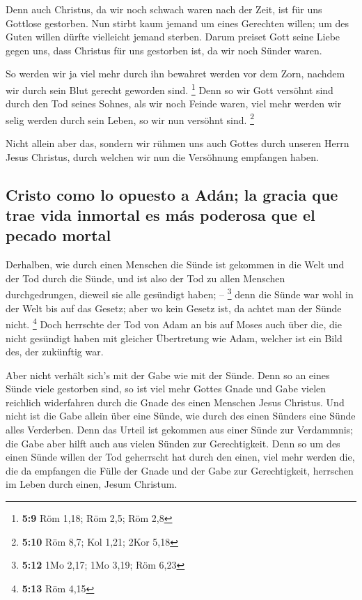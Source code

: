  Denn auch Christus, da wir noch schwach waren nach der
Zeit, ist für uns Gottlose gestorben.  Nun stirbt kaum
jemand um eines Gerechten willen; um des Guten willen dürfte vielleicht
jemand sterben.  Darum preiset Gott seine Liebe gegen uns,
dass Christus für uns gestorben ist, da wir noch Sünder waren.

 So werden wir ja viel mehr durch ihn bewahret werden vor
dem Zorn, nachdem wir durch sein Blut gerecht geworden sind. \footnote{\textbf{5:9}
  Röm 1,18; Röm 2,5; Röm 2,8}  Denn so wir Gott versöhnt
sind durch den Tod seines Sohnes, als wir noch Feinde waren, viel mehr
werden wir selig werden durch sein Leben, so wir nun versöhnt sind.
\footnote{\textbf{5:10} Röm 8,7; Kol 1,21; 2Kor 5,18}

 Nicht allein aber das, sondern wir rühmen uns auch
Gottes durch unseren Herrn Jesus Christus, durch welchen wir nun die
Versöhnung empfangen haben.

\hypertarget{cristo-como-lo-opuesto-a-aduxe1n-la-gracia-que-trae-vida-inmortal-es-muxe1s-poderosa-que-el-pecado-mortal}{%
\subsection{Cristo como lo opuesto a Adán; la gracia que trae vida
inmortal es más poderosa que el pecado
mortal}\label{cristo-como-lo-opuesto-a-aduxe1n-la-gracia-que-trae-vida-inmortal-es-muxe1s-poderosa-que-el-pecado-mortal}}

 Derhalben, wie durch einen Menschen die Sünde ist
gekommen in die Welt und der Tod durch die Sünde, und ist also der Tod
zu allen Menschen durchgedrungen, dieweil sie alle gesündigt haben; --
\footnote{\textbf{5:12} 1Mo 2,17; 1Mo 3,19; Röm 6,23} 
denn die Sünde war wohl in der Welt bis auf das Gesetz; aber wo kein
Gesetz ist, da achtet man der Sünde nicht. \footnote{\textbf{5:13} Röm
  4,15}  Doch herrschte der Tod von Adam an bis auf Moses
auch über die, die nicht gesündigt haben mit gleicher Übertretung wie
Adam, welcher ist ein Bild des, der zukünftig war.

 Aber nicht verhält sich's mit der Gabe wie mit der
Sünde. Denn so an eines Sünde viele gestorben sind, so ist viel mehr
Gottes Gnade und Gabe vielen reichlich widerfahren durch die Gnade des
einen Menschen Jesus Christus.  Und nicht ist die Gabe
allein über eine Sünde, wie durch des einen Sünders eine Sünde alles
Verderben. Denn das Urteil ist gekommen aus einer Sünde zur Verdammnis;
die Gabe aber hilft auch aus vielen Sünden zur Gerechtigkeit.
 Denn so um des einen Sünde willen der Tod geherrscht hat
durch den einen, viel mehr werden die, die da empfangen die Fülle der
Gnade und der Gabe zur Gerechtigkeit, herrschen im Leben durch einen,
Jesum Christum.

